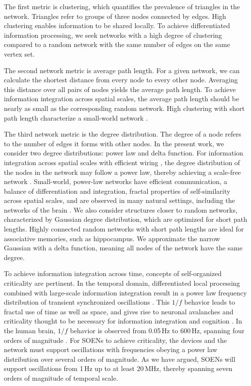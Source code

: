 \documentclass[twocolumn]{article}
\begin{document}
The first metric is clustering, which quantifies the prevalence of triangles in the network. Triangles refer to groups of three nodes connected by edges. High clustering enables information to be shared locally. To achieve differentiated information processing, we seek networks with a high degree of clustering compared to a random network with the same number of edges on the same vertex set. 

The second network metric is average path length. For a given network, we can calculate the shortest distance from every node to every other node. Averaging this distance over all pairs of nodes yields the average path length. To achieve information integration across spatial scales, the average path length should be nearly as small as the corresponding random network. High clustering with short path length characterize a small-world network \cite{wast1998}. 

The third network metric is the degree distribution. The degree of a node refers to the number of edges it forms with other nodes. In the present work, we consider two degree distributions: power law and delta function. For information integration across spatial scales with efficient wiring \cite{busp2012}, the degree distribution of the nodes in the network may follow a power law, thereby achieving a scale-free network \cite{baal1999}. Small-world, power-law networks have efficient communication, a balance of differentiation and integration, fractal properties of self-similarity across spatial scales, and are observed in many natural settings, including the networks of the brain \cite{egch2005}. We also consider structures closer to random networks, characterized by Gaussian degree distribution, which are optimized for short path lengths. Highly connected random networks with short path lengths are ideal for associative memories, such as hippocampus. We approximate the narrow Gaussian with a delta function, meaning all nodes of the network have the same degree. 

To achieve information integration across time, concepts of self-organized criticality \cite{bata1987,yara2017} are pertinent. In the temporal domain, differentiated local processing combined with large-scale information integration result in a power law frequency distribution of transient synchronized oscillations \cite{budr2004,bu2006}. This $1/f$ behavior leads to fractal use of time as well as space, and gives rise to neuronal avalanches \cite{be2007} and criticality thought to be necessary for information integration and cognition \cite{be2007,kism2009,shya2009,rusp2011}. In the human brain, $1/f$ behavior is observed from 0.05\,Hz to 600\,Hz, spanning four orders of magnitude \cite{budr2004,bu2006}. For SOENs to achieve criticality, the devices and the network must support oscillations with frequencies obeying a power law distribution \cite{bu2006} over several orders of magnitude. As we have argued, SOENs will support oscillations from 1\,Hz up to at least 20\,MHz, thereby spanning seven orders of magnitude of temporal scale. 
\end{document}
